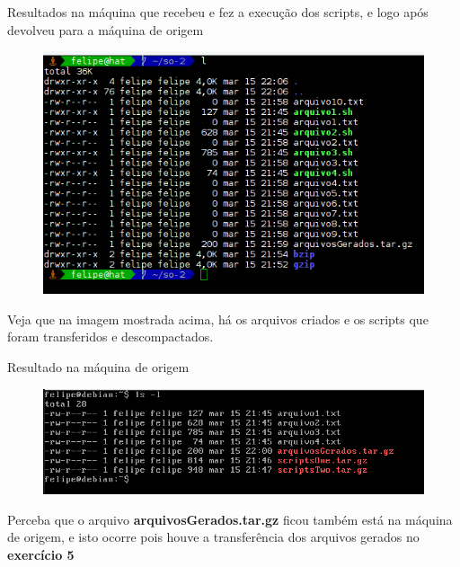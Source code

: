 \documentclass[
	12pt,				%
	openany,			%
	a4paper,			%
	chapter=TITLE,		%
	section=TITLE,		%
	english,
	brazil				%
]{abntex2}
\begin{document}
Resultados na máquina que recebeu e fez a execução dos scripts, e logo após devolveu para a máquina de origem
\begin{figure}[H]
  \centering
  \includegraphics[scale=0.5]{resultados.png}
\end{figure}


Veja que na imagem mostrada acima, há os arquivos criados e os scripts que foram transferidos e descompactados.

Resultado na máquina de origem
\begin{figure}[H]
  \centering
  \includegraphics[scale=0.5]{result_server.png}
\end{figure}

Perceba que o arquivo \textbf{arquivosGerados.tar.gz} ficou também está na máquina de origem, e isto ocorre pois houve a transferência dos arquivos gerados no \textbf{exercício 5}
\end{document}
